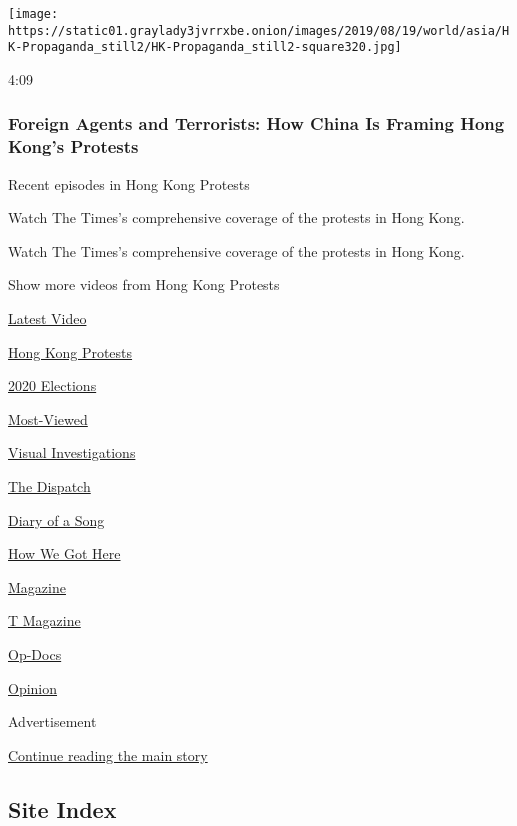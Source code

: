 \begin{itemize}
  \texttt{[image: https://static01.graylady3jvrrxbe.onion/images/2019/08/19/world/asia/HK-Propaganda\_still2/HK-Propaganda\_still2-square320.jpg]}

  4:09

  \hypertarget{foreign-agents-and-terrorists-how-china-is-framing-hong-kongs-protests}{%
  \subsubsection{Foreign Agents and Terrorists: How China Is Framing
  Hong Kong's
  Protests}\label{foreign-agents-and-terrorists-how-china-is-framing-hong-kongs-protests}}
\end{itemize}

Recent episodes in Hong Kong Protests

Watch The Times's comprehensive coverage of the protests in Hong Kong.

Watch The Times's comprehensive coverage of the protests in Hong Kong.

Show more videos from Hong Kong Protests

\href{/video}{}

\href{/video/latest-video}{Latest Video}

\href{/video/hk-protest}{Hong Kong Protests}

\href{/video/2020-Elections}{2020 Elections}

\href{/video/Most-Viewed}{Most-Viewed}

\href{/video/investigations}{Visual Investigations}

\href{/video/on-the-ground}{The Dispatch}

\href{/video/diaryofasong}{Diary of a Song}

\href{/video/how-we-got-here}{How We Got Here}

\href{/video/magazine}{Magazine}

\href{/video/t-magazine}{T Magazine}

\href{/video/op-docs}{Op-Docs}

\href{/video/opinion}{Opinion}

Advertisement

\protect\hyperlink{after-bottom}{Continue reading the main story}

\hypertarget{site-index}{%
\subsection{Site Index}\label{site-index}}

